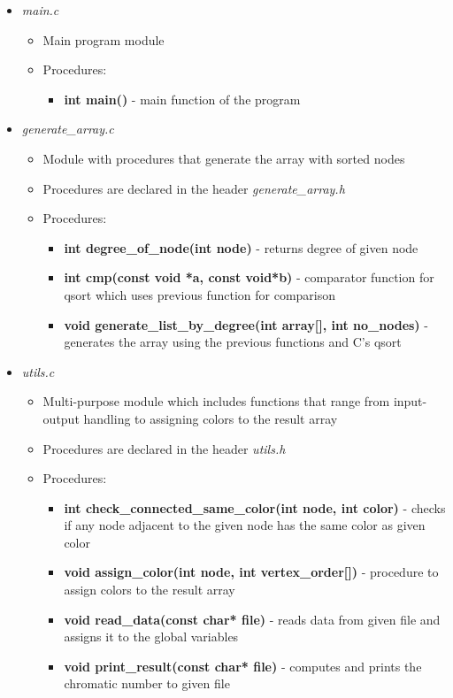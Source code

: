 \documentclass[12pt]{article}
\begin{document}
\begin{itemize}
\item \textit{main.c}
\begin{itemize}
\item Main program module
\item Procedures: \begin{itemize}\item \textbf{int main()} - main function of the program\end{itemize}
\end{itemize}
\item \textit{generate\_array.c}
\begin{itemize}
\setlength\itemsep{1em}
\item Module with procedures that generate the array with sorted nodes
\item Procedures are declared in the header \textit{generate\_array.h}
\item Procedures:
\begin{itemize}
\setlength\itemsep{1em}
\item \textbf{int degree\_of\_node(int node)} - returns degree of given node
\item \textbf{int cmp(const void *a, const void*b)} - comparator function for qsort which uses previous function for comparison
\item \textbf{void generate\_list\_by\_degree(int array[], int no\_nodes)} - generates the array using the previous functions and C's qsort
\end{itemize}
\end{itemize}
\item \textit{utils.c}
\begin{itemize}
\item Multi-purpose module which includes functions that range from input-output handling to assigning colors to the result array
\item Procedures are declared in the header \textit{utils.h}
\item Procedures:
\begin{itemize}
\setlength\itemsep{1em}
\item \textbf{int check\_connected\_same\_color(int node, int color)} - checks if any node adjacent to the given node has the same color as given color
\item \textbf{void assign\_color(int node, int vertex\_order[])} - procedure to assign colors to the result array
\item \textbf{void read\_data(const char* file)} - reads data from given file and assigns it to the global variables
\item \textbf{void print\_result(const char* file)} - computes and prints the chromatic number to given file
\end{itemize}
\end{itemize}
\end{itemize} \pagebreak
\end{document}
